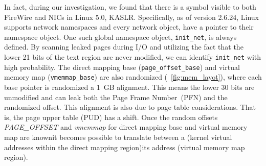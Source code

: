 In fact, during our investigation, we \DIFdelbegin {}\DIFdelend found that there is a symbol visible to both FireWire and NICs in Linux 5.0, \DIFdelbegin {}\DIFdelend \DIFaddbegin {}\DIFaddend KASLR. Specifically, as of version 2.6.24, Linux supports network namespaces and every network object, \DIFdelbegin {}\DIFdelend \DIFaddbegin {}\DIFaddend have a pointer to their namespace object. One such \DIFdelbegin {}\DIFdelend global namespace object, \texttt{init\_net}, is always defined. By scanning leaked pages during I/O and utilizing the fact that the lower 21 bits of the text region \DIFdelbegin {}\DIFdelend are never modified, we can identify \texttt{init\_net} with \DIFaddbegin {}\DIFaddend high probability.
The direct mapping base (\texttt{page\_offset\_base}) and virtual memory map (\texttt{vmemmap\_base}) are also randomized (\DIFdelbegin {}\DIFdelend \DIFaddbegin {}\DIFaddend ~\ref{fig:mem_layot}), where each \DIFdelbegin {}\DIFdelend \DIFaddbegin {}\DIFaddend base pointer is randomized \DIFdelbegin {}\DIFdelend \DIFaddbegin {}\DIFaddend a 1~GB alignment. This means \DIFdelbegin {}\DIFdelend the lower 30 bits are unmodified and can leak both the Page Frame Number~(PFN) and the randomized offset. This alignment is also due to page table considerations. That is, the page upper table (PUD) has a \DIFdelbegin {}\DIFdelend \DIFaddbegin {}\DIFaddend shift. Once the random offsets \textit{PAGE\_OFFSET} and \textit{vmemmap} for direct mapping base and virtual memory map are known\DIFaddbegin \DIFadd{, }\DIFaddend it becomes possible to translate between a \kva{} (kernel virtual addresses within the direct mapping region)\DIFdelbegin {}\DIFdelend \DIFaddbegin {}\DIFaddend its \page{} address (virtual memory map region).

